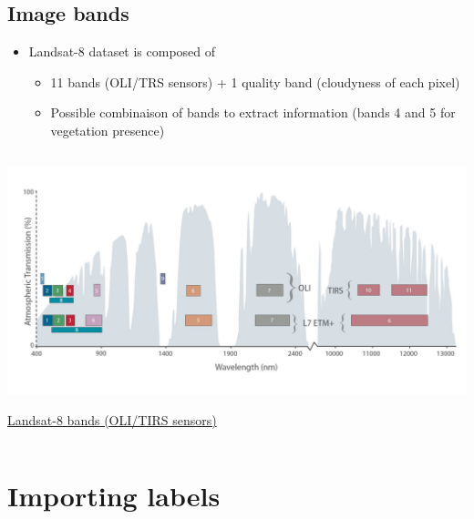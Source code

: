 \documentclass[c]{beamer}
\begin{document}
\subsection{Image bands}
\begin{frame}
 \begin{itemize}
  \item Landsat-8 dataset is composed of 
  \begin{itemize}
   \item 11 bands (OLI/TRS sensors) + 1 quality band (cloudyness of each pixel)
   \item Possible combinaison of bands to extract information (bands 4 and 5 for vegetation presence)
 \end{itemize}
\end{itemize}
 
\begin{columns}
\begin{column}{0.80\textwidth}
\begin{overlayarea}{\linewidth}{4cm}
  \centering\vfill
  \includegraphics[scale=0.13]{images/bands/landsat8_bands.jpg}
\end{overlayarea}
\begin{overlayarea}{\linewidth}{1cm}
  \centering
  \scriptsize \href{http://landsat.gsfc.nasa.gov/sentinel-2a-launches-our-compliments-our-complements/}{Landsat-8 bands (OLI/TIRS sensors)}\par
\end{overlayarea}
\end{column}
\end{columns}
\end{frame}

\section{Importing labels}
\end{document}
